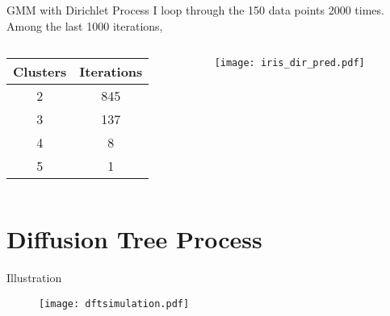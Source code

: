 \documentclass{beamer}
\begin{document}
	\begin{frame}{GMM with Dirichlet Process}
		I loop through the 150 data points 2000 times. Among the last 1000 iterations,
		\begin{columns}
			\begin{column}{0.3\textwidth}
				
				\begin{table}[htbp]
					\small
					\centering
					\begin{tabular}{cc}
						\toprule
						Clusters & Iterations\\
						\midrule
						2 & 845\\
						3 & 137 \\
						4& 8 \\
						5& 1\\
						\bottomrule
					\end{tabular}
				\end{table}
			\end{column}
			\begin{column}{0.7\textwidth}
				\begin{figure}[htbp]
					\centering
					\texttt{[image: iris\_dir\_pred.pdf]}
				\end{figure}
			\end{column}
		\end{columns} 
	\end{frame}	
	
	\section{Diffusion Tree Process}
	
	\begin{frame}
		\tableofcontents
		[
		currentsection,
		currentsubsection,
		subsectionstyle=show/shaded/hide
		]
	\end{frame}	
	
	\begin{frame}{Illustration}
		\begin{figure}[htbp]
			\centering
			\texttt{[image: dftsimulation.pdf]}
		\end{figure}
	\end{frame}	
	
\end{document}
